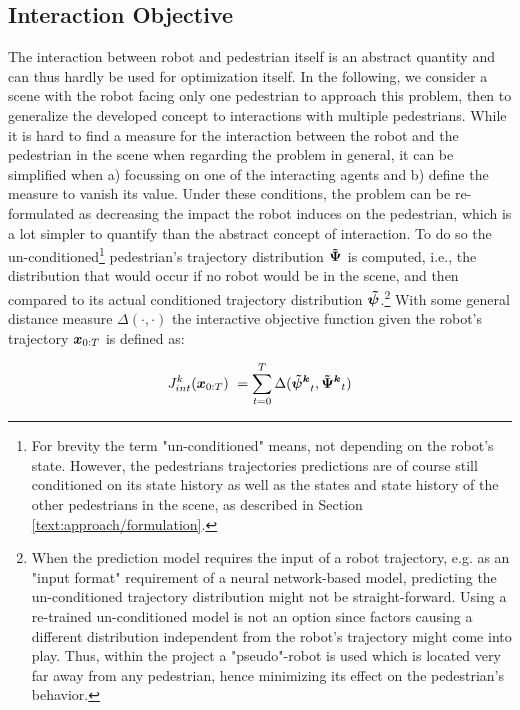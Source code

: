 \subsection{Interaction Objective}
\label{text:approach/objective/interactive}
The interaction between robot and pedestrian itself is an abstract quantity and can thus hardly be used for optimization itself. In the following, we consider a scene with the robot facing only one pedestrian to approach this problem, then to generalize the developed concept to interactions with multiple pedestrians.  
\newline
While it is hard to find a measure for the interaction between the robot and the pedestrian in the scene when regarding the problem in general, it can be simplified when a) focussing on one of the interacting agents and b) define the measure to vanish its value. Under these conditions, the problem can be re-formulated as decreasing the impact the robot induces on the pedestrian, which is a lot simpler to quantify than the abstract concept of interaction. To do so the un-conditioned\footnote{For brevity the term "un-conditioned" means, not depending on the robot's state. However, the pedestrians trajectories predictions are of course still conditioned on its state history as well as the states and state history of the other pedestrians in the scene, as described in Section \ref{text:approach/formulation}.} pedestrian's trajectory distribution $\distwo[]$ is computed, i.e., the distribution that would occur if no robot would be in the scene, and then compared to its actual conditioned trajectory distribution $\dist[]$.\footnote{When the prediction model requires the input of a robot trajectory, e.g. as an "input format" requirement of a neural network-based model, predicting the un-conditioned trajectory distribution might not be straight-forward. Using a re-trained un-conditioned model is not an option since factors causing a different distribution independent from the robot's trajectory might come into play. Thus, within the project a "pseudo"-robot is used which is located very far away from any pedestrian, hence minimizing its effect on the pedestrian's behavior.} With some general distance measure $\Delta(\cdot, \cdot)$ the interactive objective function given the robot's trajectory $\boldsymbol{x}_{0:T}$ is defined as:

\begin{equation}
J_{int}^k(\x_{0:T}) = \sum_{t=0}^T \Delta(\dist[k]_t, \distwo[k]_t)
\label{eq:objective_interaction}
\end{equation}

